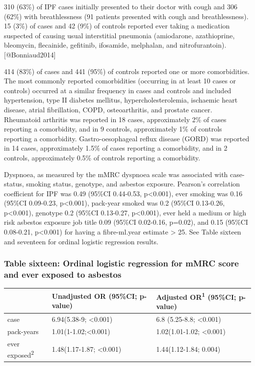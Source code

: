 \documentclass[
]{article}
\begin{document}
310 (63\%) of IPF cases initially presented to their doctor with cough
and 306 (62\%) with breathlessness (91 patients presented with cough and
breathlessness). 15 (3\%) of cases and 42 (9\%) of controls reported
ever taking a medication suspected of causing usual interstitial
pneumonia (amiodarone, azathioprine, bleomycin, flecainide, gefitinib,
ifosamide, melphalan, and nitrofurantoin).{[}@Bonniaud2014{]}

414 (83\%) of cases and 441 (95\%) of controls reported one or more
comorbidities. The most commonly reported comorbidities (occurring in at
least 10 cases or controls) occurred at a similar frequency in cases and
controls and included hypertension, type II diabetes mellitus,
hypercholesterolemia, ischaemic heart disease, atrial fibrillation,
COPD, osteoarthritis, and prostate cancer. Rheumatoid arthritis was
reported in 18 cases, approximately 2\% of cases reporting a
comorbidity, and in 9 controls, approximately 1\% of controls reporting
a comorbidity. Gastro-oesophageal reflux disease (GORD) was reported in
14 cases, approximately 1.5\% of cases reporting a comorbidity, and in 2
controls, approximately 0.5\% of controls reporting a comorbidity.

Dyspnoea, as measured by the mMRC dyspnoea scale was associated with
case-status, smoking status, genotype, and asbestos exposure. Pearson's
correlation coefficient for IPF was 0.49 (95\%CI 0.44-0.53,
p\textless0.001), ever smoking was 0.16 (95\%CI 0.09-0.23,
p\textless0.001), pack-year smoked was 0.2 (95\%CI 0.13-0.26,
p\textless0.001), genotype 0.2 (95\%CI 0.13-0.27, p\textless0.001), ever
held a medium or high risk asbestos exposure job title 0.09 (95\%CI
0.02-0.16, p=0.02), and 0.15 (95\%CI 0.08-0.21, p\textless0.001) for
having a fibre-ml.year estimate \textgreater{} 25. See Table sixteen and
seventeen for ordinal logistic regression results.

\hypertarget{table-sixteen-ordinal-logistic-regression-for-mmrc-score-and-ever-exposed-to-asbestos}{%
\subsubsection{Table sixteen: Ordinal logistic regression for mMRC score
and ever exposed to
asbestos}\label{table-sixteen-ordinal-logistic-regression-for-mmrc-score-and-ever-exposed-to-asbestos}}

\begin{longtable}[]{@{}lll@{}}
\toprule
& Unadjusted OR (95\%CI; p-value) & Adjusted OR\textsuperscript{1}
(95\%CI; p-value)\tabularnewline
\midrule
\endhead
case & 6.94(5.38-9; \textless0.001) & 6.8 (5.25-8.8;
\textless0.001)\tabularnewline
pack-years & 1.01(1-1.02;\textless0.001) & 1.02(1.01-1.02;
\textless0.001)\tabularnewline
ever exposed\textsuperscript{2} & 1.48(1.17-1.87; \textless0.001) &
1.44(1.12-1.84; 0.004)\tabularnewline
\bottomrule
\end{longtable}
\end{document}
